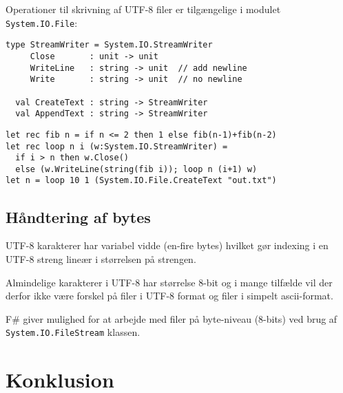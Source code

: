 \documentclass[rgb]{beamer}
\begin{document}
\begin{frame}[fragile]
\begin{footnotesize}


  Operationer til skrivning af UTF-8 filer er tilgængelige i modulet \texttt{System.IO.File}:

\begin{lstlisting}[numbers=none,frame=none,mathescape]
  type StreamWriter = System.IO.StreamWriter
     Close       : unit -> unit
     WriteLine   : string -> unit  // add newline
     Write       : string -> unit  // no newline

  val CreateText : string -> StreamWriter
  val AppendText : string -> StreamWriter
\end{lstlisting}


\begin{lstlisting}[numbers=none,frame=none,mathescape]
let rec fib n = if n <= 2 then 1 else fib(n-1)+fib(n-2)
let rec loop n i (w:System.IO.StreamWriter) =
  if i > n then w.Close()
  else (w.WriteLine(string(fib i)); loop n (i+1) w)
let n = loop 10 1 (System.IO.File.CreateText "out.txt")
\end{lstlisting}

\end{footnotesize}
\end{frame}

\subsection{Håndtering af bytes}

\begin{frame}[fragile]

  \vspace{4mm}

  UTF-8 karakterer har variabel vidde (en-fire bytes) hvilket gør
  indexing i en UTF-8 streng lineær i størrelsen på strengen.

  \vspace{4mm}

  Almindelige karakterer i UTF-8 har størrelse 8-bit og i mange
  tilfælde vil der derfor ikke være forskel på filer i UTF-8 format og
  filer i simpelt ascii-format.

  \vspace{4mm} F\# giver mulighed for at arbejde med filer på
  byte-niveau (8-bits) ved brug af \lstinline{System.IO.FileStream}
  klassen.

\end{frame}

\section*{Konklusion}
\begin{frame}[fragile]

  \vspace{3mm}
  \tableofcontents
\end{frame}
\end{document}
